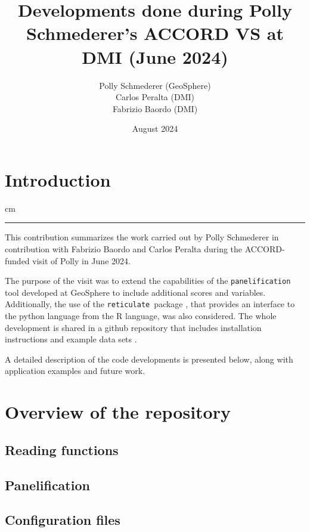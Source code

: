 \documentclass[11pt,a4paper]{article}
\date{}
\title{Developments done during Polly Schmederer's ACCORD VS at DMI (June 2024) }
\author{Polly Schmederer (GeoSphere) \\ Carlos Peralta (DMI) \\ Fabrizio Baordo (DMI)}
\date{August 2024}
\newcommand{\retis}{\texttt{reticulate }}
\newcommand{\panels}{\texttt{panelification }}
\newcommand {\sectionrule}{\vskip -0.9 cm
\color {mygray} \rule [0 cm] {17 cm}{0.1 mm} \color {black}}
\begin{document}
\maketitle
\thispagestyle{fancy}

\section{Introduction}
\sectionrule
This contribution summarizes the work carried out by Polly Schmederer in contribution with Fabrizio Baordo
and Carlos Peralta during the ACCORD-funded visit of Polly in June 2024.

The purpose of the visit was to extend the capabilities of the \panels tool \cite{panel_tool} developed at GeoSphere to include additional scores and variables. 
Additionally, the use of the \retis package \cite{reticulate}, that provides an interface to the python language from the R language, was also considered.
The whole development is shared in a github repository that includes installation instructions and example data sets \cite{repo}.

A detailed description of the code developments is presented below, along with application examples and future work.




\section{Overview of the repository}

\subsection{Reading functions}
\subsection{Panelification}
\subsection{Configuration files}
\end{document}
